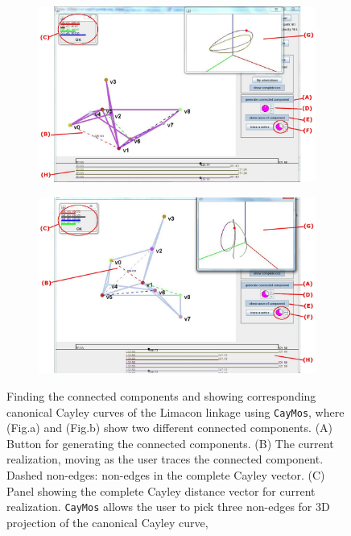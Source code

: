 \documentclass[10pt]{article}
\begin{document}
\begin{figure}[hbtp] 

\centering
\begin{subfigure}[b]{\linewidth}
\begin{center}
\includegraphics[width=.65\textwidth]{img/component1}
\end{center}
\caption{}
\end{subfigure}
%
\begin{subfigure}[b]{\linewidth}
\begin{center}
\includegraphics[width=.65\textwidth]{img/component2}
\end{center}
\caption{}
\end{subfigure}
\caption{Finding the connected components and showing corresponding canonical Cayley curves of 
the Limacon linkage using \texttt{CayMos}, where (Fig.a) and (Fig.b) show two different connected components. 
(A) Button for generating the connected components. 
(B) The current realization, moving as the user traces the connected component. Dashed non-edges: non-edges in the complete Cayley vector. 
(C) Panel showing the complete Cayley distance vector for current realization. 
\texttt{CayMos} allows the user to pick three non-edges for 3D projection of the canonical Cayley curve,  
}
\end{figure}
\end{document}
